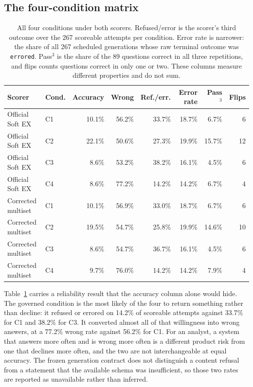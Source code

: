 \subsection{The four-condition matrix}

\begin{table}[htbp]
\centering
\caption{All four conditions under both scorers. Refused/error is the scorer's
third outcome over the 267 scoreable attempts per condition. Error rate is
narrower: the share of all 267 scheduled generations whose raw terminal outcome
was \texttt{errored}. Pass$^3$ is the share of the 89 questions correct in all
three repetitions, and flips counts questions correct in only one or two. These
columns measure different properties and do not sum.}
\label{tab:matrix}
\begin{tabular}{llrrrrrr}
\toprule
Scorer & Cond. & Accuracy & Wrong & Ref./err. & Error rate & Pass$^3$ & Flips \\
\midrule
Official Soft EX & C1 & 10.1\% & 56.2\% & 33.7\% & 18.7\% & 6.7\% & 6 \\
Official Soft EX & C2 & 22.1\% & 50.6\% & 27.3\% & 19.9\% & 15.7\% & 12 \\
Official Soft EX & C3 & 8.6\% & 53.2\% & 38.2\% & 16.1\% & 4.5\% & 6 \\
Official Soft EX & C4 & 8.6\% & 77.2\% & 14.2\% & 14.2\% & 6.7\% & 4 \\
\midrule
Corrected multiset & C1 & 10.1\% & 56.9\% & 33.0\% & 18.7\% & 6.7\% & 6 \\
Corrected multiset & C2 & 19.5\% & 54.7\% & 25.8\% & 19.9\% & 14.6\% & 10 \\
Corrected multiset & C3 & 8.6\% & 54.7\% & 36.7\% & 16.1\% & 4.5\% & 6 \\
Corrected multiset & C4 & 9.7\% & 76.0\% & 14.2\% & 14.2\% & 7.9\% & 4 \\
\bottomrule
\end{tabular}
\end{table}

Table~\ref{tab:matrix} carries a reliability result that the accuracy column
alone would hide. The governed condition is the most likely of the four to return
something rather than decline: it refused or errored on 14.2\% of scoreable
attempts against 33.7\% for C1 and 38.2\% for C3. It converted almost all of that
willingness into wrong answers, at a 77.2\% wrong rate against 56.2\% for C1. For
an analyst, a system that answers more often and is wrong more often is a
different product risk from one that declines more often, and the two are not
interchangeable at equal accuracy. The frozen generation contract does not
distinguish a content refusal from a statement that the available schema was
insufficient, so those two rates are reported as unavailable rather than
inferred.

